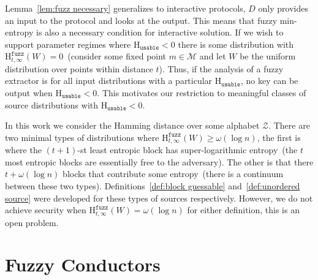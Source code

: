 \documentclass[11pt]{article}
\newcommand{\lemref}[1]{\mbox{Lemma~\ref{#1}}}
\newcommand{\Hfuzz}{\mathrm{H}^{\mathtt{fuzz}}_{t,\infty}}
\newcommand{\Huse}{\mathrm{H}_{\mathtt{usable}}}
\begin{document}
\lemref{lem:fuzz necessary} generalizes to interactive protocols, $D$ only provides an input to the protocol and looks at the output.  This means that fuzzy min-entropy is also a necessary condition for interactive solution.  %
If we wish to support parameter regimes where $\Huse<0$ there is some distribution with $\Hfuzz(W)=0$~(consider some fixed point $m\in\mathcal{M}$ and let $W$ be the uniform distribution over points within distance $t$).  Thus, if the analysis of a fuzzy extractor is for all input distributions with a particular $\Huse$, no key can be output when $\Huse<0$.   This motivates our restriction to meaningful classes of source distributions with $\Huse<0$.

In this work we consider the Hamming distance over some alphabet $\mathcal{Z}$.  There are two minimal types of distributions where $\Hfuzz(W)\geq \omega(\log n)$, the first is where the $(t+1)$-st least entropic block has super-logarithmic entropy~(the $t$ most entropic blocks are essentially free to the adversary).  The other is that there $t+\omega(\log n)$ blocks that contribute some entropy~(there is a continuum between these two types).  Definitions~\ref{def:block guessable} and~\ref{def:unordered source} were developed for these types of sources respectively.  However, we do not achieve security when $\Hfuzz(W)= \omega(\log n)$ for either definition, this is an open problem. 

\section{Fuzzy Conductors}
\end{document}
